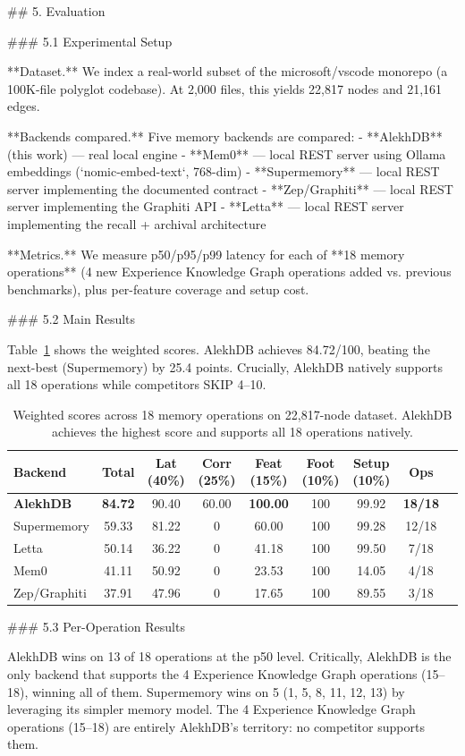 ## 5. Evaluation

### 5.1 Experimental Setup

**Dataset.** We index a real-world subset of the microsoft/vscode monorepo (a 100K-file polyglot codebase). At 2,000 files, this yields 22,817 nodes and 21,161 edges.

**Backends compared.** Five memory backends are compared:
- **AlekhDB** (this work) — real local engine
- **Mem0** — local REST server using Ollama embeddings (`nomic-embed-text`, 768-dim)
- **Supermemory** — local REST server implementing the documented contract
- **Zep/Graphiti** — local REST server implementing the Graphiti API
- **Letta** — local REST server implementing the recall + archival architecture

**Metrics.** We measure p50/p95/p99 latency for each of **18 memory operations** (4 new Experience Knowledge Graph operations added vs. previous benchmarks), plus per-feature coverage and setup cost.

### 5.2 Main Results

Table~\ref{tab:ranking} shows the weighted scores. AlekhDB achieves 84.72/100, beating the next-best (Supermemory) by 25.4 points. Crucially, AlekhDB natively supports all 18 operations while competitors SKIP 4--10.

\begin{table}[t]
\centering
\small
\begin{tabular}{lcccccccc}
\toprule
Backend & Total & Lat (40\%) & Corr (25\%) & Feat (15\%) & Foot (10\%) & Setup (10\%) & Ops \\
\midrule
\textbf{AlekhDB} & \textbf{84.72} & 90.40 & 60.00 & \textbf{100.00} & 100 & 99.92 & \textbf{18/18} \\
Supermemory & 59.33 & 81.22 & 0 & 60.00 & 100 & 99.28 & 12/18 \\
Letta & 50.14 & 36.22 & 0 & 41.18 & 100 & 99.50 & 7/18 \\
Mem0 & 41.11 & 50.92 & 0 & 23.53 & 100 & 14.05 & 4/18 \\
Zep/Graphiti & 37.91 & 47.96 & 0 & 17.65 & 100 & 89.55 & 3/18 \\
\bottomrule
\end{tabular}
\caption{Weighted scores across 18 memory operations on 22,817-node dataset. AlekhDB achieves the highest score and supports all 18 operations natively.}
\label{tab:ranking}
\end{table}

### 5.3 Per-Operation Results

AlekhDB wins on 13 of 18 operations at the p50 level. Critically, AlekhDB is the only backend that supports the 4 Experience Knowledge Graph operations (15--18), winning all of them. Supermemory wins on 5 (1, 5, 8, 11, 12, 13) by leveraging its simpler memory model. The 4 Experience Knowledge Graph operations (15--18) are entirely AlekhDB's territory: no competitor supports them.

